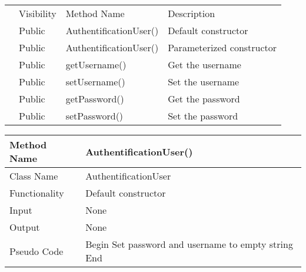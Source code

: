 \documentclass{article}
\newcommand\tab[1][1cm]{\hspace*{#1}}
\begin{document}
\begin{table}[]
{\begin{tabular}{|p{2cm}||p{1.5cm}||p{6cm}||p{3cm}||p{3cm}|}
\rowcolor[HTML]{C0C0C0} 
\cellcolor[HTML]{C0C0C0}{\color[HTML]{000000} }                             & Visibility & Method Name & \multicolumn{2}{l|}{\cellcolor[HTML]{C0C0C0}Description} \\ \cline{2-5} 
\multirow{-2}{*}{\cellcolor[HTML]{C0C0C0}{\color[HTML]{000000} Methods}}    &  Public      &  AuthentificationUser()       & \multicolumn{2}{l|}{Default constructor }                               \\ \cline{2-5}
\multirow{-2}{*}{\cellcolor[HTML]{C0C0C0}{\color[HTML]{000000} }}    &  Public      &  AuthentificationUser()       & \multicolumn{2}{l|}{Parameterized constructor }                               \\ \cline{2-5}
\multirow{-2}{*}{\cellcolor[HTML]{C0C0C0}{\color[HTML]{000000} }}    &  Public      &  getUsername()       & \multicolumn{2}{l|}{Get the username }                               \\ \cline{2-5}
\multirow{-2}{*}{\cellcolor[HTML]{C0C0C0}{\color[HTML]{000000} }}    &  Public      &  setUsername()       & \multicolumn{2}{l|}{Set the username }                               \\ \cline{2-5}
\multirow{-2}{*}{\cellcolor[HTML]{C0C0C0}{\color[HTML]{000000} }}    &  Public      &  getPassword()       & \multicolumn{2}{l|}{Get the password }                               \\ \cline{2-5}
\multirow{-2}{*}{\cellcolor[HTML]{C0C0C0}{\color[HTML]{000000} }}    &  Public      &  setPassword()       & \multicolumn{2}{l|}{Set the password }                               \\ \cline{2-5}

\end{tabular}
}
\end{table}


\begin{center}
\begin{tabular}{|p{2.5cm}||p{10cm}|}
\hline
Method Name & AuthentificationUser() \\
\hline
Class Name & AuthentificationUser \\
\hline
Functionality & Default constructor\\
\hline
Input & None\\
\hline
Output & None\\
\hline
Pseudo Code & Begin\newline
\tab Set password and username to empty string\newline
End \\
\hline
\end{tabular}
\end{center}
\end{document}
